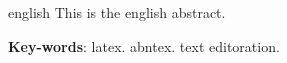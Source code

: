 \begin{resumo}[Abstract]
 \begin{otherlanguage*}{english}
   This is the english abstract.
   
   \vspace{\onelineskip}
 
   \noindent 
   \textbf{Key-words}: latex. abntex. text editoration.
 \end{otherlanguage*}
\end{resumo}
